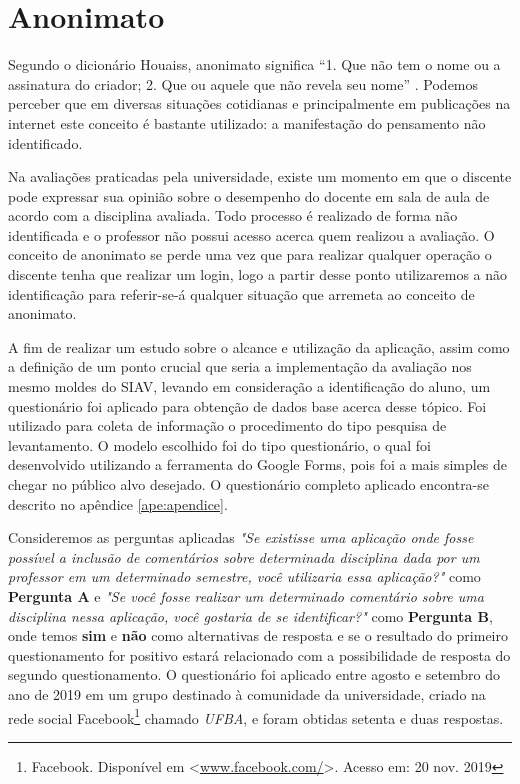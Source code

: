\documentclass[12pt, a4paper]{report}
\begin{document}
\section{Anonimato}
\label{sec:anonimato}

Segundo o dicionário Houaiss, anonimato significa ``1. Que não tem o nome ou a assinatura do criador; 2. Que ou aquele que não revela seu nome'' \cite[p. 7]{houasis2001}. Podemos perceber que em diversas situações cotidianas e principalmente em publicações na internet este conceito é bastante utilizado: a manifestação do pensamento não identificado.

Na avaliações praticadas pela universidade, existe um momento em que o discente pode expressar sua opinião sobre o desempenho do docente em sala de aula de acordo com a disciplina avaliada. Todo processo é realizado de forma não identificada e o professor não possui acesso acerca quem realizou a avaliação. O conceito de anonimato se perde uma vez que para realizar qualquer operação o discente tenha que realizar um login, logo a partir desse ponto utilizaremos a não identificação para referir-se-á qualquer situação que arremeta ao conceito de anonimato.

A fim de realizar um estudo sobre o alcance e utilização da aplicação, assim como a definição de um ponto crucial que seria a implementação da avaliação nos mesmo moldes do \ac{SIAV}, levando em consideração a identificação do aluno, um questionário foi aplicado para obtenção de dados base acerca desse tópico. 
Foi utilizado para coleta de informação o procedimento do tipo pesquisa de levantamento. O modelo escolhido foi do tipo questionário, o qual foi desenvolvido utilizando a ferramenta do Google Forms, pois foi a mais simples de chegar no público alvo desejado. O questionário completo aplicado encontra-se descrito no apêndice \ref{ape:apendice}.

Consideremos as perguntas aplicadas \textit{"Se existisse uma aplicação onde fosse possível a inclusão de comentários sobre determinada disciplina dada por um professor em um determinado semestre, você utilizaria essa aplicação?"} como \textbf{Pergunta A} e \textit{ 
"Se você fosse realizar um determinado comentário sobre uma disciplina nessa aplicação, você gostaria de se identificar?"} como \textbf{Pergunta B}, onde temos \textbf{sim} e \textbf{não} como alternativas de resposta e se o resultado do primeiro  questionamento for positivo estará relacionado com a possibilidade de resposta do segundo questionamento. O questionário foi aplicado entre agosto e setembro do ano de 2019 em um grupo destinado à comunidade da universidade, criado na rede social Facebook\footnote{Facebook. Disponível em <\url{www.facebook.com/}>. Acesso em: 20 nov. 2019} chamado \textit{UFBA}, e foram obtidas setenta e duas respostas. 
\end{document}

